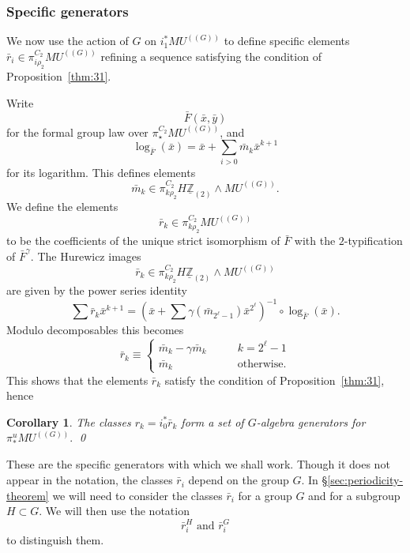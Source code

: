 \documentclass{amsart}
\newtheorem{cor}[equation]{Corollary}
\theoremstyle{definition}
\theoremstyle{remark}
\newcommand{\Z}{{\mathbb Z}}
\newcommand{\mutn}[1]{MU^{(\!(#1)\!)}}
\newcommand{\piu}{\pi^{u}}
\newcommand{\mbm}{\gbar{m}}
\newcommand{\zltm}{\underline{\Z}_{(2)}}
\newcommand{\gbar}{\bar}
\newcommand{\rr}{\gbar{r}}
\newcommand{\zt}{C_{2}}
\begin{document}
\subsubsection{Specific generators}
\label{sec:specific-generators}

We now use the action of $G$ on $i_{1}^{\ast}\mutn{G}$ to define
specific elements $\bar{r}_{i}\in\pi^{\zt}_{i\rho_{2}}\mutn{G}$ refining
a sequence satisfying the condition of Proposition~\ref{thm:31}.

Write
\[
\gbar{F}(\gbar{x},\gbar{y})
\]
for the formal group law over $\pi^{\zt}_{\star}\mutn{G}$, and
\[
\log_{\gbar{F}}(\gbar{x})=\gbar{x} + \sum_{i>0}\mbm_{k}\gbar{x}^{k+1}
\]
for its logarithm.  This defines elements
\[
\mbm_{k}\in \pi^{\zt}_{k\rho_{2}} H\zltm\wedge \mutn{G}.
\]
We define the elements
\begin{equation}
\label{eq:107}
\rr_{k}\in \pi^{\zt}_{k\rho_{2}} \mutn{G}
\end{equation}
to be the coefficients of the unique strict isomorphism of $\gbar{F}$
with the $2$-typification of $\gbar{F}^{\gamma}$.  The Hurewicz images
\[
\rr_{k}\in\pi^{\zt}_{k\rho_{2}}H\zltm\wedge \mutn{G}
\]
are given by the power series identity
\begin{equation}\label{eq:48}
\sum \rr_{k}\gbar{x}^{k+1} =
\left(\gbar{x}+ \sum
\gamma(\gbar{m}_{2^{\ell}-1})\gbar{x}^{2^{\ell}}\right)^{-1}
\circ \log_{\gbar{F}}(\gbar{x}).
\end{equation}
Modulo decomposables this becomes
\begin{equation}\label{eq:49}
\rr_{k} \equiv
\begin{cases}
\gbar{m}_{k}-\gamma\gbar{m}_{k} &\qquad k = 2^{\ell}-1 \\
\gbar{m}_{k} &\qquad \text{otherwise.}
\end{cases}
\end{equation}
This shows that the elements $\rr_{k}$ satisfy the condition of
Proposition~\ref{thm:31}, hence

\begin{cor}
\label{thm:96} The classes $r_{k}=i_{0}^{\ast}\rr_{k}$ form a set of
$G$-algebra generators for $\piu_{\ast}\mutn{G}.$  \qed
\end{cor}


These are the specific generators with which we shall work.  Though it
does not appear in the notation, the classes $\rr_{i}$ depend on the
group $G$.  In \S\ref{sec:periodicity-theorem} we will need to
consider the classes $\rr_{i}$ for a group $G$ and for a subgroup
$H\subset G$.  We will then use the notation
\[
\rr^{H}_{i}\text{ and }\rr^{G}_{i}
\]
to distinguish them.
\end{document}
